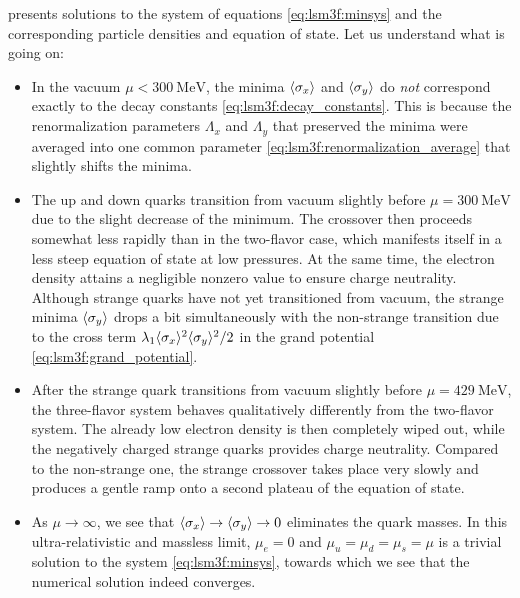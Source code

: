  presents solutions to the system of equations \eqref{eq:lsm3f:minsys} and the corresponding particle densities and equation of state.
Let us understand what is going on:
\begin{itemize}
\item In the vacuum $\mu < \SI{300}{\mega\electronvolt}$, the minima $\langle \sigma_x \rangle$ and $\langle \sigma_y \rangle$ do \emph{not} correspond exactly to the decay constants \eqref{eq:lsm3f:decay_constants}.
      This is because the renormalization parameters $\Lambda_x$ and $\Lambda_y$ that preserved the minima were averaged into one common parameter \eqref{eq:lsm3f:renormalization_average} that slightly shifts the minima.
\item The up and down quarks transition from  vacuum slightly before $\mu = \SI{300}{\mega\electronvolt}$ due to the slight decrease of the minimum.
      The crossover then proceeds somewhat less rapidly than in the two-flavor case, which manifests itself in a less steep  equation of state at low pressures.
      At the same time, the electron density attains a negligible nonzero value to ensure charge neutrality.
      Although strange quarks have not yet transitioned from vacuum, the strange minima $\langle \sigma_y \rangle$ drops a bit simultaneously with the non-strange transition due to the cross term $\lambda_1 \langle \sigma_x \rangle^2 \langle \sigma_y \rangle^2 / 2$ in the grand potential \eqref{eq:lsm3f:grand_potential}.
\item After the strange quark transitions from vacuum slightly before $\mu = \SI{429}{\mega\electronvolt}$, the three-flavor system behaves qualitatively differently from the two-flavor system.
      The already low electron density is then completely wiped out, while the negatively charged strange quarks provides charge neutrality.
      Compared to the non-strange one, the strange crossover takes place very slowly and produces a gentle ramp onto a second plateau of the equation of state.
\item As $\mu \rightarrow \infty$, we see that $\langle \sigma_x \rangle \rightarrow \langle \sigma_y \rangle \rightarrow 0$ eliminates the quark masses.
      In this ultra-relativistic and massless limit, $\mu_e = 0$ and $\mu_u = \mu_d = \mu_s = \mu$ is a trivial solution to the system \eqref{eq:lsm3f:minsys},
      towards which we see that the numerical solution indeed converges.
\end{itemize}


